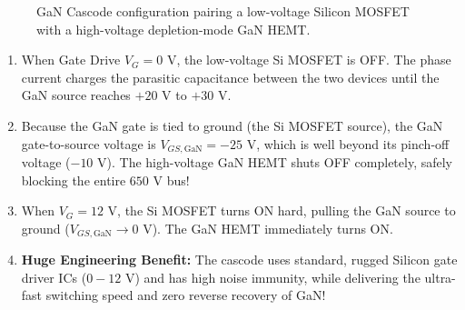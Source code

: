 \documentclass[11pt,a4paper]{article}
\begin{document}
\begin{figure}[htbp]
\centering
{}
\caption{GaN Cascode configuration pairing a low-voltage Silicon MOSFET with a high-voltage depletion-mode GaN HEMT.}
\label{fig:gan_cascode}
\end{figure}

\begin{conceptbox}
\begin{enumerate}
  \item When Gate Drive $V_G = 0\text{ V}$, the low-voltage Si MOSFET is OFF. The phase current charges the parasitic capacitance between the two devices until the GaN source reaches $+20\text{ V}$ to $+30\text{ V}$.
  \item Because the GaN gate is tied to ground (the Si MOSFET source), the GaN gate-to-source voltage is $V_{GS,\text{GaN}} = -25\text{ V}$, which is well beyond its pinch-off voltage ($-10\text{ V}$). The high-voltage GaN HEMT shuts OFF completely, safely blocking the entire $650\text{ V}$ bus!
  \item When $V_G = 12\text{ V}$, the Si MOSFET turns ON hard, pulling the GaN source to ground ($V_{GS,\text{GaN}} \to 0\text{ V}$). The GaN HEMT immediately turns ON.
  \item \textbf{Huge Engineering Benefit:} The cascode uses standard, rugged Silicon gate driver ICs ($0-12\text{ V}$) and has high noise immunity, while delivering the ultra-fast switching speed and zero reverse recovery of GaN!
\end{enumerate}
\end{conceptbox}
\end{document}
